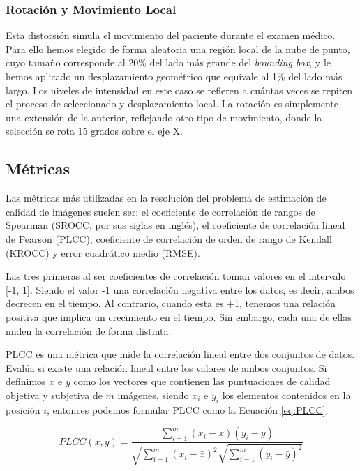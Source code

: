 \subsubsection{Rotación y Movimiento Local}
Esta distorsión simula el movimiento del paciente durante el examen médico. 
Para ello hemos elegido de forma aleatoria una región local de la nube de punto, 
cuyo tamaño corresponde al 20\% del lado más grande del \emph{bounding box}, y 
le hemos aplicado un desplazamiento geométrico que equivale al 1\% del lado 
más largo. Los niveles de intensidad en este caso se refieren a cuántas veces 
se repiten el proceso de seleccionado y desplazamiento local. 
La rotación es simplemente una extensión de la anterior, reflejando otro tipo de movimiento, 
donde la selección se rota 15 grados sobre el eje X.
\subsection{Métricas}
\label{sec:Metricas}
Las métricas más utilizadas en la resolución del problema de estimación de calidad 
de imágenes suelen ser: el coeficiente de correlación de rangos de Spearman (SROCC, 
por sus siglas en inglés), el coeficiente de correlación lineal de Pearson (PLCC), coeficiente de correlación de orden de rango de Kendall (KROCC)
y error cuadrático medio (RMSE)\cite{VisualMedicalQualityBook}.

Las tres primeras al ser coeficientes de correlación toman valores en el intervalo 
[-1, 1]. Siendo el valor -1 una correlación negativa entre los datos, es decir,
ambos decrecen en el tiempo. Al contrario, cuando esta es +1, tenemos una relación 
positiva que implica un crecimiento en el tiempo. Sin embargo, cada una de ellas 
miden la correlación de forma distinta. 

PLCC es una métrica que mide la correlación lineal entre dos conjuntos de datos.
Evalúa si existe una relación lineal entre los valores de ambos conjuntos.
Si definimos $x$ e $y$ como los vectores que contienen las puntuaciones de 
calidad objetiva y subjetiva de $m$ imágenes, siendo $x_i$ e $y_i$ 
los elementos contenidos en la posición $i$, entonces podemos formular 
PLCC como la Ecuación \eqref{eq:PLCC}.

\begin{equation}
  PLCC(x,y) = \frac{\sum_{i=1}^m (x_i - \bar x)(y_i - \bar y)}{\sqrt{\sum_{i=1}^m (x_i - \bar x)^2}\sqrt{\sum_{i=1}^m (y_i - \bar y)^2}}
\label{eq:PLCC}
\end{equation}

